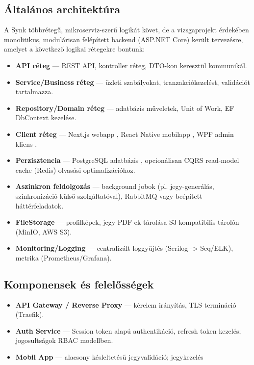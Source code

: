 \documentclass[colorlinks]{docs}
\theoremstyle{definition}
\theoremstyle{remark}
\begin{document}
\subsection{Általános architektúra}
A Synk többrétegű, mikroserviz-szerű logikát követ, de a vizsgaprojekt érdekében monolitikus, modulárisan felépített backend (ASP.NET Core) \cite{dotnet10} került tervezésre, amelyet a következő logikai rétegekre bontunk:
\begin{itemize}
    \item \textbf{API réteg} — REST API, kontroller réteg, DTO-kon keresztül kommunikál.
    \item \textbf{Service/Business réteg} — üzleti szabályokat, tranzakciókezelést, validációt tartalmazza.
    \item \textbf{Repository/Domain réteg} — adatbázis műveletek, Unit of Work, EF DbContext kezelése.
    \item \textbf{Client réteg} — Next.js webapp \cite{nextjs}, React Native mobilapp \cite{reactnative}, WPF admin kliens \cite{gossman2005}.
    \item \textbf{Perzisztencia} — PostgreSQL adatbázis \cite{postgresql}, opcionálisan CQRS read-model cache (Redis) olvasási optimalizációhoz.
    \item \textbf{Aszinkron feldolgozás} — background jobok (pl. jegy-generálás, szinkronizáció külső szolgáltatóval), RabbitMQ vagy beépített háttérfeladatok.
    \item \textbf{FileStorage} — profilképek, jegy PDF-ek tárolása S3-kompatibilis tárolón (MinIO, AWS S3).
    \item \textbf{Monitoring/Logging} — centralizált loggyűjtés (Serilog -> Seq/ELK), metrika (Prometheus/Grafana).
\end{itemize}

\subsection{Komponensek és felelősségek}
\begin{itemize}
    \item \textbf{API Gateway / Reverse Proxy} — kérelem irányítás, TLS termináció (Traefik).
    \item \textbf{Auth Service} — Session token alapú authentikáció, refresh token kezelés; jogosultságok RBAC modellben.
    \item \textbf{Mobil App} — alacsony késleltetésű jegyvalidáció; jegykezelés
\end{itemize}
\end{document}
